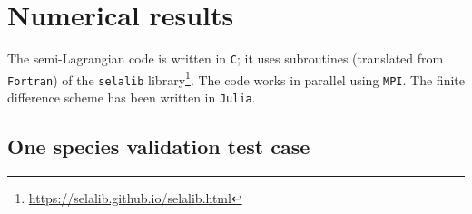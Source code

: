 \documentclass{article}
\numberwithin{equation}{section}
\newcommand{\todo}[1]{{\color{red}\textbf{#1}}}
\begin{document}
%
%

\section{Numerical results}\label{sec:numresults}

The semi-Lagrangian code is written in \texttt{C}; it uses subroutines (translated from \texttt{Fortran}) of the \texttt{selalib} library\footnote{\url{https://selalib.github.io/selalib.html}}. The code works in parallel using \texttt{MPI}.
The finite difference scheme has been written in \texttt{Julia}.

\subsection{One species validation test case}
\end{document}

